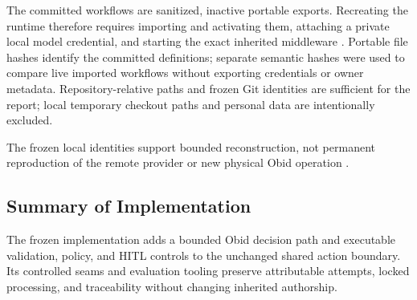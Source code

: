 The committed workflows are sanitized, inactive portable exports. Recreating
the runtime therefore requires importing and activating them, attaching a
private local model credential, and starting the exact inherited middleware
\cite{n8nExportImport}.
Portable file hashes identify the committed definitions; separate semantic
hashes were used to compare live imported workflows without exporting
credentials or owner metadata. Repository-relative paths and frozen Git
identities are sufficient for the report; local temporary checkout paths and
personal data are intentionally excluded.

The frozen local identities support bounded reconstruction, not permanent
reproduction of the remote provider or new physical Obid operation
\cite{kapoor2025agentsmatter}.

\subsection{Summary of Implementation}\label{subsec:impl-summary}

The frozen implementation adds a bounded Obid decision path and executable
validation, policy, and HITL controls to the unchanged shared action boundary.
Its controlled seams and evaluation tooling preserve attributable attempts,
locked processing, and traceability without changing inherited authorship.

\setlength{\emergencystretch}{0pt}
